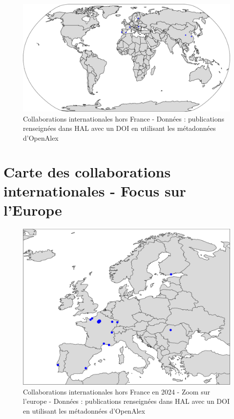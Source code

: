 \documentclass[french, 11pt]{../../dibiso/biso}
\begin{document}
\begin{figure}[!h]
  \hspace{-.1\textwidth}\includegraphics[width=1.2\textwidth]{figures/collaboration_map_world.pdf}
  \caption{Collaborations internationales hors France - Données : publications renseignées dans HAL avec un DOI en utilisant les métadonnées d'OpenAlex}
  \label{fig_collab_map}
\end{figure}







\pagebreak

\section{Carte des collaborations internationales - Focus sur l’Europe}

\begin{figure}[!h]
  \includegraphics[width=\textwidth]{figures/collaboration_map_europe.pdf}
  \caption{Collaborations internationales hors France en 2024 - Zoom sur l'europe - Données : publications renseignées dans HAL avec un DOI en utilisant les métadonnées d'OpenAlex}
  \label{fig_collab_map_europe}
\end{figure}
\end{document}
